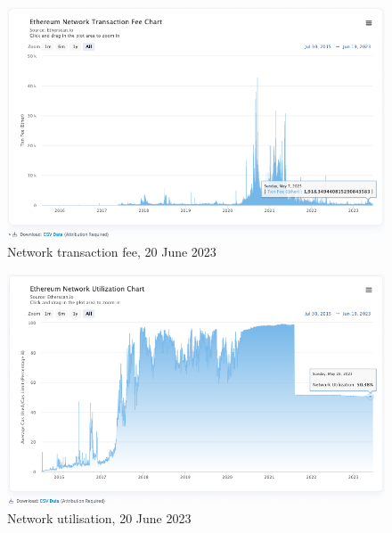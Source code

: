 \documentclass[UTF8]{article}
\begin{document}
\begin{figure}[htbp]
\begin{center}
\includegraphics[width=0.9\linewidth]{images/nwfeetxns}
\caption{Network transaction fee, 20 June 2023}
\label{fig:nwfeetxns}
\end{center}
\end{figure}

\begin{figure}[htbp]
\begin{center}
\includegraphics[width=0.9\linewidth]{images/nwutil}
\caption{Network utilisation, 20 June 2023}
\label{fig:nwutil}
\end{center}
\end{figure}
\end{document}
